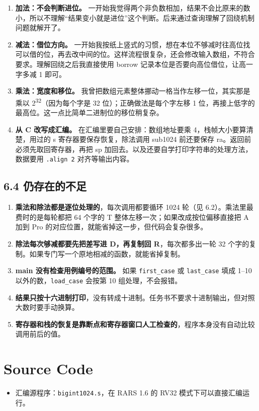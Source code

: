 \documentclass[11pt,a4paper]{ctexart}
\providecommand{\tightlist}{\setlength{\itemsep}{0pt}\setlength{\parskip}{0pt}}
\begin{document}
\begin{enumerate}
\def\labelenumi{\arabic{enumi}.}
\tightlist
\item
  \textbf{加法：不会判断进位。}
  一开始我觉得两个非负数相加，结果不会比原来的数小，所以不理解``结果变小就是进位''这个判断。后来通过查询理解了回绕机制问题就解开了。
\item
  \textbf{减法：借位方向。}
  一开始我按纸上竖式的习惯，想在本位不够减时往高位找可以借的位，再去改中间的位。这样流程很复杂，还会修改输入数组，不符合要求。理解回绕之后我直接使用
  borrow 记录本位是否要向高位借位，让高一字多减 1 即可。
\item
  \textbf{乘法：宽度和移位。}
  我曾把数组元素整体挪动一格当作左移一位，其实那是乘以
  2\textsuperscript{32}（因为每个字是 32 位）；正确做法是每个字左移 1
  位，再接上低字的最高位。这一点比简单二进制位的移位稍复杂。
\item
  \textbf{从 C 改写成汇编。} 在汇编里要自己安排：数组地址要乘
  4，栈帧大小要算清楚，用过的 s 寄存器要保存恢复，除法调用 sub1024
  前还要保存 ra。返回前必须先取回寄存器，再把 sp
  加回去。以及还要自学打印字符串的处理方法，数据要用 \texttt{.align\ 2}
  对齐等输出内容。
\end{enumerate}

\FloatBarrier

\hypertarget{ux4ecdux5b58ux5728ux7684ux4e0dux8db3}{%
\subsection{6.4
仍存在的不足}\label{ux4ecdux5b58ux5728ux7684ux4e0dux8db3}}

\begin{enumerate}
\def\labelenumi{\arabic{enumi}.}
\tightlist
\item
  \textbf{乘法和除法都是逐位处理的}，每次调用都要循环 1024 轮（见
  6.2）。乘法里最费时的是每轮都把 64 个字的 T
  整体左移一次；如果改成按位偏移直接把 A 加到 Pro
  的对应位置，就能省掉这一步，但代码会复杂很多。
\item
  \textbf{除法每次够减都要先把差写进 D，再复制回 R}，每次都多出一轮 32
  个字的复制。如果专门写一个原地相减的函数，就能省掉复制。
\item
  \textbf{main 没有检查用例编号的范围。} 如果 \texttt{first\_case} 或
  \texttt{last\_case} 填成 1--10 以外的数，\texttt{load\_case} 会按第 10
  组处理，不会报错。
\item
  \textbf{结果只按十六进制打印}，没有转成十进制。任务书不要求十进制输出，但对照大数时要手动换算。
\item
  \textbf{寄存器和栈的恢复是靠断点和寄存器窗口人工检查的}，程序本身没有自动比较调用前后的值。
\end{enumerate}

\FloatBarrier

\hypertarget{source-code}{%
\section{Source Code}\label{source-code}}

\begin{itemize}
\tightlist
\item
  汇编源程序：\texttt{bigint1024.s}，在 RARS 1.6 的 RV32
  模式下可以直接汇编运行。
\end{itemize}
\end{document}
